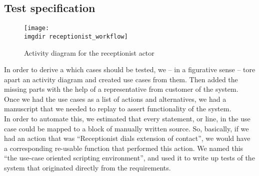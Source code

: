 \subsection{Test specification}
\begin{figure}[h]
\texttt{[image: \\imgdir receptionist\_workflow]}
\centering
\caption{Activity diagram for the receptionist actor}
\label{fig:activity_diagram_receptionist}
\end{figure}

In order to derive a which cases should be tested, we -- in a figurative sense --  tore apart an activity diagram and created use cases from them. Then added the missing parts with the help of a representative from customer of the system. Once we had the use cases as a list of actions and alternatives, we had a manuscript that we needed to replay to assert functionality of the system.\\
In order to automate this, we estimated that every statement, or line, in the use case could be mapped to a block of manually written source. So, basically, if we had an action that was ``Receptionist dials extension of contact'', we would have a corresponding re-usable function that performed this action. We named this ``the use-case oriented scripting environment'', and used it to write up tests of the system that originated directly from the requirements.

